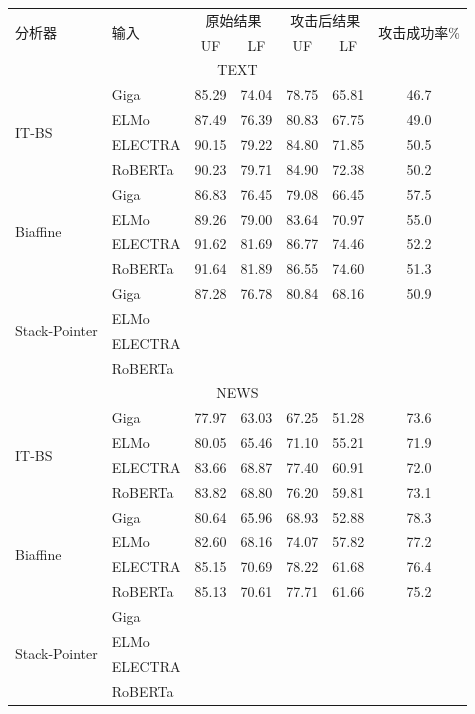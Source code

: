 \begin{table}[htbp]
    \vspace{0.5em}\centering\wuhao
	\begin{tabular}{llccccc}
		\toprule[1.5pt]
		\multirow{2}{*}{分析器}&\multirow{2}{*}{输入}& \multicolumn{2}{c}{原始结果} & \multicolumn{2}{c}{攻击后结果} & \multirow{2}{*}{攻击成功率\%} \\
		\cmidrule(r){3-4} \cmidrule(r){5-6}
		& & UF & LF & UF & LF \\
		\midrule[1pt]
		\multicolumn{7}{c}{TEXT} \\
		\hline
		\multirow{4}{*}{ IT-BS} 
		& Giga    & 85.29 & 74.04 & 78.75 &	65.81 & 46.7 \\
		& ELMo    & 87.49 & 76.39 & 80.83 & 67.75 &	49.0 \\
		& ELECTRA & 90.15 & 79.22 & 84.80 &	71.85 &	50.5 \\
		& RoBERTa & 90.23 & 79.71 & 84.90 & 72.38 & 50.2 \\
		\hline
		\multirow{4}{*}{ Biaffine} 
		& Giga    & 86.83 & 76.45 & 79.08 & 66.45 & 57.5 \\
		& ELMo    & 89.26 & 79.00 & 83.64 &	70.97 & 55.0 \\
		& ELECTRA & 91.62 & 81.69 & 86.77 &	74.46 &	52.2 \\
		& RoBERTa & 91.64 & 81.89 & 86.55 &	74.60 &	51.3 \\
		\hline
		\multirow{4}{*}{ Stack-Pointer} 
		& Giga    & 87.28 & 76.78 & 80.84 &	68.16 &	50.9 \\
		& ELMo    & \\
		& ELECTRA & \\
		& RoBERTa & \\
		\hline
		\multicolumn{7}{c}{NEWS} \\
		\hline
		\multirow{4}{*}{ IT-BS} 
		& Giga    & 77.97 & 63.03 & 67.25 &	51.28 &	73.6 \\
		& ELMo    & 80.05 &	65.46 & 71.10 &	55.21 &	71.9 \\
		& ELECTRA & 83.66 &	68.87 & 77.40 &	60.91 &	72.0 \\
		& RoBERTa & 83.82 &	68.80 & 76.20 &	59.81 &	73.1 \\
		\hline
		\multirow{4}{*}{ Biaffine} 
		& Giga    & 80.64 &	65.96 & 68.93 &	52.88 &	78.3 \\
		& ELMo    & 82.60 &	68.16 & 74.07 &	57.82 &	77.2 \\
		& ELECTRA & 85.15 &	70.69 & 78.22 &	61.68 &	76.4 \\
		& RoBERTa & 85.13 &	70.61 & 77.71 &	61.66 &	75.2 \\
		\hline
		\multirow{4}{*}{ Stack-Pointer} 
		& Giga    &  \\
		& ELMo    & \\
		& ELECTRA & \\
		& RoBERTa & \\
		\bottomrule[1.5pt]
	\end{tabular}
\end{table}

